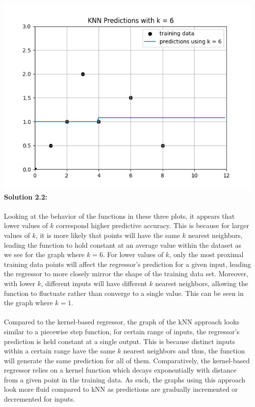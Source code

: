 \documentclass[submit]{harvardml}
\begin{document}
\includegraphics[scale=0.75]{k6.png} \\
\noin \textbf{Solution 2.2:} \\ \\
\noin Looking at the behavior of the functions in these three plots, it appears that lower values of $k$ correspond higher predictive accuracy. This is because for larger values of $k$, it is more likely that points will have the same $k$ nearest neighbors, leading the function to hold constant at an average value within the dataset as we see for the graph where $k=6$. For lower values of $k$, only the most proximal training data points will affect the regressor's prediction for a given input, leading the regressor to more closely mirror the shape of the training data set. Moreover, with lower $k$, different inputs will have different $k$ nearest neighbors, allowing the function to fluctuate rather than converge to a single value. This can be seen in the graph where $k=1$. \\ \\
Compared to the kernel-based regressor, the graph of the kNN approach looks similar to a piecewise step function, for certain range of inputs, the regressor's prediction is held constant at a single output. This is because distinct inputs within a certain range have the same $k$ nearest neighbors and thus, the function will generate the same prediction for all of them. Comparatively, the kernel-based regressor relies on a kernel function which decays exponentially with distance from a given point in the training data. As such, the graphs using this approach look more fluid compared to kNN as predictions are gradually incremented or decremented for inputs. \\ \\
\end{document}

